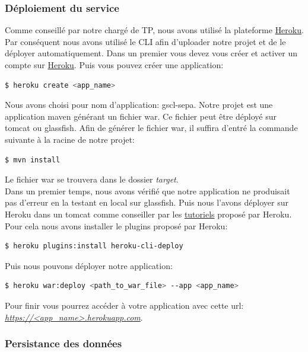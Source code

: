 \documentclass{article}
\begin{document}
      \subsubsection{Déploiement du service}
	Comme conseillé par notre chargé de TP, nous avons utilisé la plateforme \href{https://www.heroku.com}{Heroku}.
	Par conséquent nous avons utilisé le CLI afin d'uploader notre projet et de le déployer automatiquement.
	Dans un premier vous devez vous créer et activer un compte sur \href{https://www.heroku.com}{Heroku}. Puis vous pouvez créer une application:
	\begin{lstlisting}[language=bash]
    $ heroku create <app_name>
	\end{lstlisting}
	Nous avons choisi pour nom d'application: gscl-sepa.
	Notre projet est une application maven générant un fichier war. Ce fichier peut être déployé sur tomcat ou glassfish. Afin de générer
	le fichier war, il suffira d'entré la commande suivante à la racine de notre projet:
	\begin{lstlisting}[language=bash]
    $ mvn install
	\end{lstlisting}
	Le fichier war se trouvera dans le dossier \emph{target}. \\
	Dans un premier temps, nous avons vérifié que notre application ne produisait pas d'erreur en la testant en local sur glassfish.
	Puis nous l'avons déployer sur Heroku dans un tomcat comme conseiller par les \href{https://devcenter.heroku.com/articles/war-deployment}{tutoriels} proposé par Heroku.
	Pour cela nous avons installer le plugins proposé par Heroku:
	\begin{lstlisting}[language=bash]
    $ heroku plugins:install heroku-cli-deploy
	\end{lstlisting}
	Puis nous pouvons déployer notre application:
	\begin{lstlisting}[language=bash]
    $ heroku war:deploy <path_to_war_file> --app <app_name>
	\end{lstlisting}
	Pour finir vous pourrez accéder à votre application avec cette url:\\ \emph{\url{https://<app_name>.herokuapp.com}}.

      \subsubsection{Persistance des données}
\end{document}
